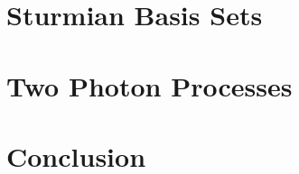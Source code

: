 \documentclass[12pt,twoside]{thesis92e}
\begin{document}
%
\chapter{Sturmian Basis Sets}


\chapter{Two Photon Processes}


%


%

\chapter{Conclusion}



\begin{appendices}
  \chapter{}
  

\end{appendices}

%

%

\clearpage 
\pagestyle{plain}

\end{document}
